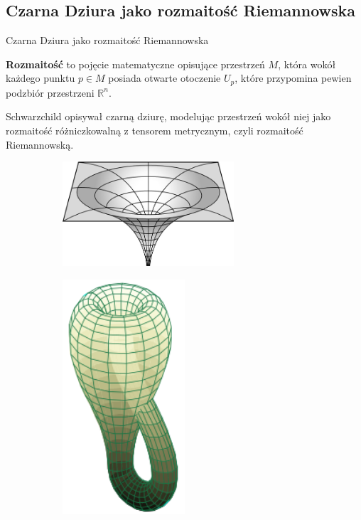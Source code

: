 \documentclass[polish, 9pt, xcolor=table, hyperref={pdfpagemode=FullScreen}]{beamer}
\newcommand{\R}{\mathbb{R}}
\begin{document}
\subsection{Czarna Dziura jako rozmaitość Riemannowska}

\begin{frame}{Czarna Dziura jako rozmaitość Riemannowska}

\textbf{Rozmaitość} to pojęcie matematyczne opisujące przestrzeń $M$, która wokół każdego punktu $p \in M$ posiada otwarte otoczenie $U_p$, które przypomina pewien podzbiór przestrzeni $\R^n$.

Schwarzchild opisywał czarną dziurę, modelując przestrzeń wokół niej jako rozmaitość różniczkowalną z tensorem metrycznym, czyli rozmaitość Riemannowską.

\begin{figure}
\centering
    \begin{subfigure}[t]{0.3\textwidth}
        \includegraphics[width=0.7\textwidth]{ilustracje/dziura.jpg} 
    \end{subfigure}
    \begin{subfigure}[b]{0.3\textwidth}
        \includegraphics[width=0.5\textwidth]{ilustracje/rozmaitosc2.svg.png}

\end{subfigure}
\end{figure}
\end{frame}
\end{document}

